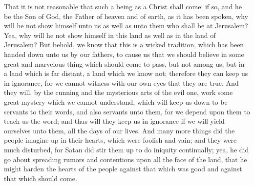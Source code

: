 That it is not reasonable that such a being as a Christ shall come; if so, and he be the Son of God, the Father of heaven and of earth, as it has been spoken, why will he not show himself unto us as well as unto them who shall be at Jerusalem?
\bverse \iffalse Yea, why will he not show himself in this land as well as in the land of Jerusalem? \fi
Yea, why will he not show himself in this land as well as in the land of Jerusalem?
\bverse \iffalse But behold, we know that this is a wicked tradition, which has been handed down unto us by our fathers, to cause us that we should believe in some great and marvelous thing which should come to pass, but not among us, but in a land which is far distant, a land which we know not; therefore they can keep us in ignorance, for we cannot witness with our own eyes that they are true. \fi
But behold, we know that this is a wicked tradition, which has been handed down unto us by our fathers, to cause us that we should believe in some great and marvelous thing which should come to pass, but not among us, but in a land which is far distant, a land which we know not; therefore they can keep us in ignorance, for we cannot witness with our own eyes that they are true.
\bverse \iffalse And they will, by the cunning and the mysterious arts of the evil one, work some great mystery which we cannot understand, which will keep us down to be servants to their words, and also servants unto them, for we depend upon them to teach us the word; and thus will they keep us in ignorance if we will yield ourselves unto them, all the days of our lives. \fi
And they will, by the cunning and the mysterious arts of the evil one, work some great mystery which we cannot understand, which will keep us down to be servants to their words, and also servants unto them, for we depend upon them to teach us the word; and thus will they keep us in ignorance if we will yield ourselves unto them, all the days of our lives.
\bverse \iffalse And many more things did the people imagine up in their hearts, which were foolish and vain; and they were much disturbed, for Satan did stir them up to do iniquity continually; yea, he did go about spreading rumors and contentions upon all the face of the land, that he might harden the hearts of the people against that which was good and against that which should come. \fi
And many more things did the people imagine up in their hearts, which were foolish and vain; and they were much disturbed, for Satan did stir them up to do iniquity continually; yea, he did go about spreading rumors and contentions upon all the face of the land, that he might harden the hearts of the people against that which was good and against that which should come.
